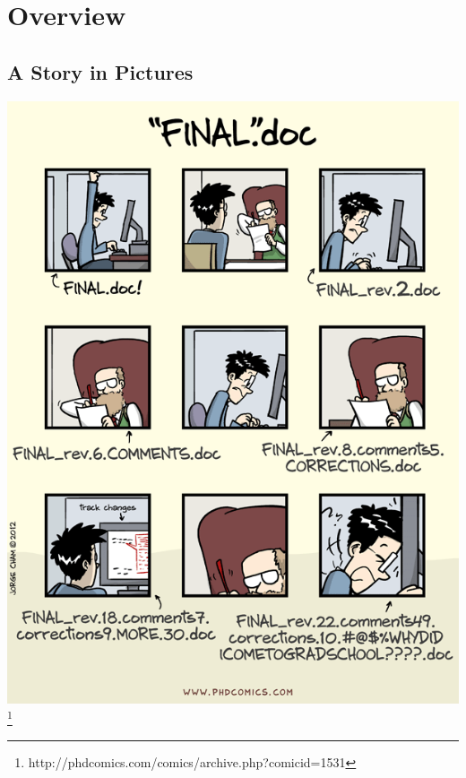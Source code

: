 \section{Overview}

\subsection{A Story in Pictures}
\begin{frame}
  \centering
  \includegraphics[height=0.95\textheight]{phd1531}
  \footnote{http://phdcomics.com/comics/archive.php?comicid=1531}
\end{frame}

